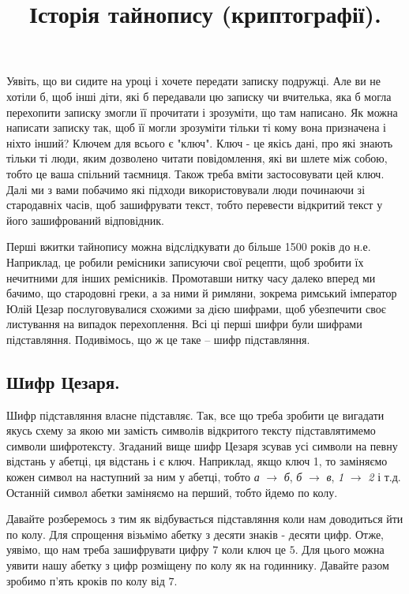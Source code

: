 \documentclass{book}
\title{Історія тайнопису (криптографії).}
\begin{document}
\maketitle

Уявіть, що ви сидите на уроці і хочете передати записку подружці. Але ви не
хотіли б, щоб інші діти, які б передавали цю записку чи вчителька, яка б могла
перехопити записку змогли її прочитати і зрозуміти, що там написано. Як можна
написати записку так, щоб її могли зрозуміти тільки ті кому вона призначена і
ніхто інший? Ключем для всього є "ключ". Ключ - це якісь дані, про які знають
тільки ті люди, яким дозволено читати повідомлення, які ви шлете між собою,
тобто це ваша спільний таємниця. Також треба вміти застосовувати цей ключ. Далі
ми з вами побачимо які підходи використовували люди починаючи зі стародавніх
часів, щоб зашифрувати текст, тобто перевести відкритий текст у його
зашифрований відповідник.

Перші вжитки тайнопису можна відслідкувати до більше 1500 років до н.е.
Наприклад, це робили ремісники записуючи свої рецепти, щоб зробити їх нечитними
для інших ремісників. Промотавши нитку часу далеко вперед ми бачимо, що
стародовні греки, а за ними й римляни, зокрема римський імператор Юлій Цезар послуговувалися
схожими за дією шифрами, щоб убезпечити своє листування на випадок
перехоплення. Всі ці перші шифри були шифрами підставляння. Подивімось, що ж це
таке -- шифр підставляння.

\subsection*{Шифр Цезаря.}

Шифр підставляння власне підставляє. Так, все що треба зробити це вигадати
якусь схему за якою ми замість символів відкритого тексту підставлятимемо
символи шифротексту. Згаданий вище шифр Цезаря зсував усі символи на певну
відстань у абетці, ця відстань і є ключ. Наприклад, якщо ключ 1, то заміняємо
кожен символ на наступний за ним у абетці, тобто \emph{а} $\to$ \emph{б},
\emph{б} $\to$ \emph{в}, \emph{1} $\to$ \emph{2} і т.д. Останній символ абетки
заміняємо на перший, тобто йдемо по колу.

Давайте розберемось з тим як відбувається підставляння коли нам доводиться йти
по колу. Для спрощення візьмімо абетку з десяти знаків - десяти цифр. Отже,
уявімо, що нам треба зашифрувати цифру $7$ коли ключ це $5$. Для цього можна уявити
нашу абетку з цифр розміщену по колу як на годиннику. Давайте разом зробимо
п'ять кроків по колу від $7$.
\end{document}
